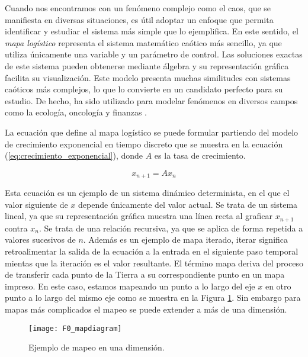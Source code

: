         Cuando nos encontramos con un fenómeno complejo como el caos, que se manifiesta en diversas situaciones, es útil adoptar un enfoque que permita identificar y estudiar el sistema más simple que lo ejemplifica. En este sentido, el \emph{mapa logístico} representa el sistema matemático caótico más sencillo, ya que utiliza únicamente una variable y un parámetro de control. Las soluciones exactas de este sistema pueden obtenerse mediante álgebra y su representación gráfica facilita su visualización. Este modelo presenta muchas similitudes con sistemas caóticos más complejos, lo que lo convierte en un candidato perfecto para su estudio. De hecho, ha sido utilizado para modelar fenómenos en diversos campos como la ecología, oncología y finanzas \cite{Sprott2003}.

        La ecuación que define al mapa logístico se puede formular partiendo del modelo de crecimiento exponencial en tiempo discreto que se muestra en la ecuación (\ref{eq:crecimiento_exponencial}), donde $A$ es la tasa de crecimiento.

        \begin{equation}
            x_{n+1} = A x_{n}
            \label{eq:crecimiento_exponencial}
        \end{equation}

        Esta ecuación es un ejemplo de un sistema dinámico determinista, en el que el valor siguiente de $x$ depende únicamente del valor actual. Se trata de un sistema lineal, ya que su representación gráfica muestra una línea recta al graficar $x_{n+1}$ contra $x_{n}$. Se trata de una relación recursiva, ya que se aplica de forma repetida a valores sucesivos de $n$. Además es un ejemplo de mapa iterado, iterar significa retroalimentar la salida de la ecuación a la entrada en el siguiente paso temporal mientas que la iteración es el valor resultante. El término mapa deriva del proceso de transferir cada punto de la Tierra a su correspondiente punto en un mapa impreso. En este caso, estamos mapeando un punto a lo largo del eje $x$ en otro punto a lo largo del mismo eje como se muestra en la Figura \ref{fig:F0_mapdiagram}. Sin embargo para mapas más complicados el mapeo se puede extender a más de una dimensión. 


        \begin{figure}[hbtp]
            \centering
            \texttt{[image: F0\_mapdiagram]}
            \caption{Ejemplo de mapeo en una dimensión.}
            \label{fig:F0_mapdiagram}
        \end{figure}



